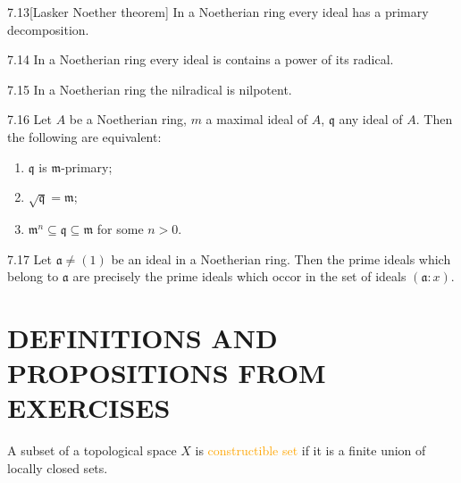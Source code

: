\begin{proposition}{7.13}[Lasker Noether theorem]
	In a Noetherian ring every ideal has a primary decomposition.
\end{proposition}

\begin{proposition}{7.14}
	In a Noetherian ring every ideal is contains a power of its radical.
\end{proposition}

\begin{corollary}{7.15}
	In a Noetherian ring the nilradical is nilpotent.
\end{corollary}

\begin{corollary}{7.16}
	Let $A$ be a Noetherian ring, $m$ a maximal ideal of $A$, $\mathfrak{q}$ any ideal of $A$. Then the following are equivalent:
	\begin{enumerate}[label=\textup{(\roman*)},ref=\thecorollarytemp(\roman*)]
		\item\label{7.16.1} $\mathfrak{q}$ is $\mathfrak{m}$-primary;
		\item\label{7.16.2} $\sqrt{\mathfrak{q}}=\mathfrak{m}$;
		\item\label{7.16.3} $\mathfrak{m}^n\subseteq\mathfrak{q}\subseteq\mathfrak{m}$ for some $n>0$.
	\end{enumerate}
\end{corollary}

\begin{proposition}{7.17}
	Let $\mathfrak{a}\neq(1)$ be an ideal in a Noetherian ring. Then the prime ideals which belong to $\mathfrak{a}$ are precisely the prime ideals which occor in the set of ideals $(\mathfrak{a}:x)$.
\end{proposition}

\section*{DEFINITIONS AND PROPOSITIONS FROM EXERCISES}

\begin{definition}
	A subset of a topological space $X$ is \textcolor{orange}{constructible set} if it is a finite union of locally closed sets.
\end{definition}